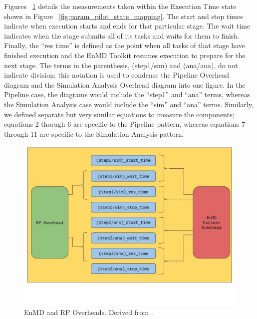\documentclass[]{article}
\begin{document}
		Figures ~\ref{fig:pattern_rp_overheads} details the measurements taken within the Execution Time state shown in Figure ~\ref{fig:param_pilot_state_mapping}. The start and stop times indicate when execution starts and ends for that particular stage. The wait time indicates when the stage submits all of its tasks and waits for them to finish. Finally, the ``res time'' is defined as the point when all tasks of that stage have finished execution and the EnMD Toolkit resumes execution to prepare for the next stage. The terms in the parenthesis, (step1/sim) and (ana/ana), do not indicate division; this notation is used to condense the Pipeline Overhead diagram and the Simulation Analysis Overhead diagram into one figure. In the Pipeline case, the diagrams would include the ``step1'' and ``ana'' terms, whereas the Simulation Analysis case would include the ``sim'' and ``ana'' terms. Similarly, we defined separate but very similar equations to measure the components; equations 2 thorugh 6 are specific to the Pipeline pattern, whereas equations 7 through 11 are specific to the Simulation-Analysis pattern.

		\begin{figure}[H]
			\centering
			\includegraphics[scale=.3]{diagrams/pattern_and_rp_overheads.jpg}
			\caption{EnMD and RP Overheads. Derived from \cite{rp_state_diagram}.}
			\label{fig:pattern_rp_overheads}
		\end{figure}
\end{document}
